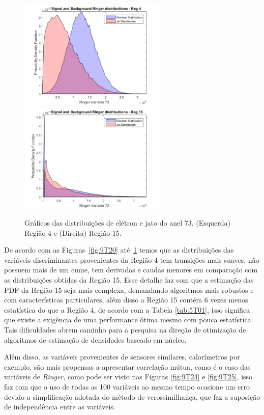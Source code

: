 \begin{figure}[H]
	\centering
	\includegraphics[width=7cm]{./textuais/algoritmo/figuras/DISTKERNELET3ETA0VAR73KF1.png}
    \includegraphics[width=7cm]{./textuais/algoritmo/figuras/DISTKERNELET4ETA2VAR73KF1.png}\\
	\caption{Gráficos das distribuições de elétron e jato do anel 73. (Esquerda) Região 4 e (Direita) Região 15.}
	\label{fig:9T23}
\end{figure}

De acordo com as Figuras~\ref{fig:9T20} até~\ref{fig:9T23} temos que as distribuições das variáveis discriminantes provenientes da Região 4 tem transições mais suaves, não possuem mais de um cume, tem derivadas e caudas menores em comparação com as distribuições obtidas da Região 15. Esse detalhe faz com que a estimação das PDF da Região 15 seja mais complexa, demandando algoritmos mais robustos e com características particulares, além disso a Região 15 contém 6 vezes menos estatística do que a Região 4, de acordo com a Tabela \ref{tab:5T01}, isso significa que existe a exigência de uma performance ótima mesmo com pouca estatística. Tais dificuldades abrem caminho para a pesquisa na direção de otimização de algoritmos de estimação de densidades baseado em núcleo.

Além disso, as variáveis provenientes de sensores similares, calorímetros por exemplo, são mais propensas a apresentar correlação mútua, como é o caso das variáveis de \textit{Ringer}, como pode ser visto nas Figuras \ref{fig:9T24} e \ref{fig:9T25}, isso faz com que o uso de todas as 100 variáveis ao mesmo tempo ocasione um erro devido a simplificação adotada do método de verossimilhança, que faz a suposição de independência entre as variáveis.


